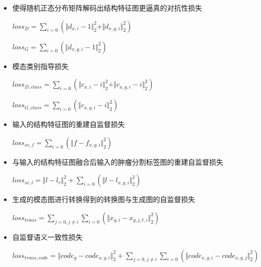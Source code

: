 \documentclass[letterpaper]{article} %
\begin{document}
\begin{itemize}
	\item 使得随机正态分布矩阵解码出结构特征图更逼真的对抗性损失

\begin{center}
	$loss_{D}=\sum\limits_{i=0}(\Vert{d_{x,i}-1}\Vert_{2}^{2}+\Vert{d_{x,g,i}}\Vert_{2}^{2})$
\end{center}

\begin{center}
	$loss_{G}=\sum\limits_{i=0}(\Vert{d_{x,g,i}-1}\Vert_{2}^{2})$
\end{center}

	\item 模态类别指导损失

\begin{center}
	$loss_{D,class}=\sum\limits_{i=0}(\Vert{c_{x,i}-i}\Vert_{2}^{2}+\Vert{c_{x,g,i}-i}\Vert_{2}^{2})$
\end{center}

\begin{center}
	$loss_{G,class}=\sum\limits_{i=0}(\Vert{c_{x,g,i}-i}\Vert_{2}^{2})$
\end{center}

	\item 输入的结构特征图的重建自监督损失
	
\begin{center}
	$loss_{sv,f}=\sum\limits_{i=0}(\Vert{f-f_{x,g,i}}\Vert_{2}^{2})$
\end{center}

	\item 与输入的结构特征图融合后输入的肿瘤分割标签图的重建自监督损失
	
\begin{center}
	$loss_{sv,l}=\Vert{l-l_r}\Vert_{2}^{2}+\sum\limits_{i=0}(\Vert{l-l_{x,g,i}}\Vert_{2}^{2})$
\end{center}

	\item 生成的模态图进行转换得到的转换图与生成图的自监督损失

\begin{center}
	$loss_{trans}=\sum\limits_{j=0,j\neq i}\sum\limits_{i=0}(\Vert{x_{g,i}-x_{g,j,t,i}}\Vert_{2}^{2})$
\end{center}

	\item 自监督语义一致性损失
	
\begin{center}
	$loss_{trans,code}=\Vert{code_g-code_{x,g,i}}\Vert_{2}^{2}+\sum\limits_{j=0,j\neq i}\sum\limits_{i=0}(\Vert{code_{x,g,i}-code_{x,g,j}}\Vert_{2}^{2})$
\end{center}

\end{itemize}
\end{document}

